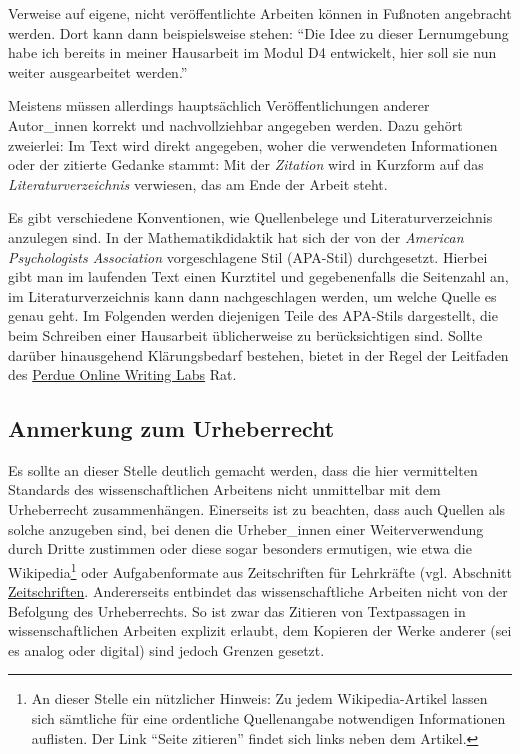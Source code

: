 \documentclass[ngerman,oneside,12pt,a4paper]{scrbook}
\begin{document}
Verweise auf eigene, nicht veröffentlichte Arbeiten können in Fußnoten
angebracht werden. Dort kann dann beispielsweise stehen: \enquote{Die
Idee zu dieser Lernumgebung habe ich bereits in meiner Hausarbeit im
Modul D4 entwickelt, hier soll sie nun weiter ausgearbeitet werden.}

Meistens müssen allerdings hauptsächlich Veröffentlichungen anderer
Autor\_innen korrekt und nachvollziehbar angegeben werden. Dazu gehört
zweierlei: Im Text wird direkt angegeben, woher die verwendeten
Informationen oder der zitierte Gedanke stammt: Mit der \emph{Zitation}
wird in Kurzform auf das \emph{Literaturverzeichnis} verwiesen, das am
Ende der Arbeit steht.

Es gibt verschiedene Konventionen, wie Quellenbelege und
Literaturverzeichnis anzulegen sind. In der Mathematikdidaktik hat sich
der von der \emph{American Psychologists Association} vorgeschlagene
Stil (APA-Stil) durchgesetzt. Hierbei gibt man im laufenden Text einen
Kurztitel und gegebenenfalls die Seitenzahl an, im Literaturverzeichnis
kann dann nachgeschlagen werden, um welche Quelle es genau geht. Im
Folgenden werden diejenigen Teile des APA-Stils dargestellt, die beim
Schreiben einer Hausarbeit üblicherweise zu berücksichtigen sind. Sollte
darüber hinausgehend Klärungsbedarf bestehen, bietet in der Regel der
Leitfaden des
\href{http://owl.english.purdue.edu/owl/section/2/10/}{Perdue Online
Writing Labs} Rat.

\subsection*{Anmerkung zum
Urheberrecht}\label{anmerkung-zum-urheberrecht}

Es sollte an dieser Stelle deutlich gemacht werden, dass die hier
vermittelten Standards des wissenschaftlichen Arbeitens nicht
unmittelbar mit dem Urheberrecht zusammenhängen. Einerseits ist zu
beachten, dass auch Quellen als solche anzugeben sind, bei denen die
Urheber\_innen einer Weiterverwendung durch Dritte zustimmen oder diese
sogar besonders ermutigen, wie etwa die Wikipedia\footnote{An dieser
  Stelle ein nützlicher Hinweis: Zu jedem Wikipedia-Artikel lassen sich
  sämtliche für eine ordentliche Quellenangabe notwendigen Informationen
  auflisten. Der Link \enquote{Seite zitieren} findet sich links neben
  dem Artikel.} oder Aufgabenformate aus Zeitschriften für Lehrkräfte
(vgl. Abschnitt \protect\hyperlink{zeitschriften}{Zeitschriften}.
Andererseits entbindet das wissenschaftliche Arbeiten nicht von der
Befolgung des Urheberrechts. So ist zwar das Zitieren von Textpassagen
in wissenschaftlichen Arbeiten explizit erlaubt, dem Kopieren der Werke
anderer (sei es analog oder digital) sind jedoch Grenzen gesetzt.
\end{document}
